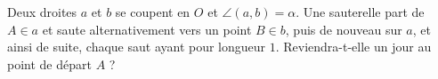 Deux droites $a$ et $b$ se coupent en $O$ et $\angle(a, b) = \alpha$. Une sauterelle part de $A \in a$ et saute alternativement vers un point $B \in b$, puis de nouveau sur $a$, et ainsi de suite, chaque saut ayant pour longueur $1$. Reviendra-t-elle un jour au point de départ $A$ ?
